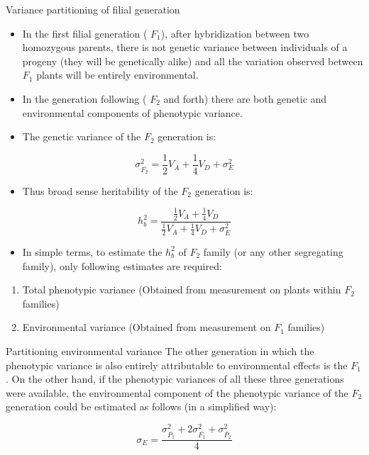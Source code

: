 \documentclass[11pt,ignorenonframetext,aspectratio=169]{beamer}
\providecommand{\tightlist}{%
  \setlength{\itemsep}{0pt}\setlength{\parskip}{0pt}}
\begin{document}
\begin{frame}{Variance partitioning of filial generation}
\protect\hypertarget{variance-partitioning-of-filial-generation}{}
\begin{itemize}
\tightlist
\item
  In the first filial generation ( \(F_1\)), after hybridization between
  two homozygous parents, there is not genetic variance between
  individuals of a progeny (they will be genetically alike) and all the
  variation observed between \(F_1\) plants will be entirely
  environmental.
\item
  In the generation following ( \(F_2\) and forth) there are both
  genetic and environmental components of phenotypic variance.
\item
  The genetic variance of the \(F_2\) generation is:
\end{itemize}

\[
\sigma_{\bar{F_2}}^2 = \frac{1}{2}V_A + \frac{1}{4}V_D + \sigma_E^2
\]

\begin{itemize}
\tightlist
\item
  Thus broad sense heritability of the \(F_2\) generation is:
\end{itemize}

\[
\label{eqn:hbs-filial}
h_b^2 = \frac{\frac{1}{2}V_A + \frac{1}{4}V_D}{\frac{1}{2}V_A + \frac{1}{4}V_D + \sigma_E^2}
\tag{iii}
\]

\begin{itemize}
\tightlist
\item
  In simple terms, to estimate the \(h_b^2\) of \(F_2\) family (or any
  other segregating family), only following estimates are required:
\end{itemize}

\begin{enumerate}
\tightlist
\item
  Total phenotypic variance (Obtained from measurement on plants within
  \(F_2\) families)
\item
  Environmental variance (Obtained from measurement on \(F_1\) families)
\end{enumerate}
\end{frame}

\begin{frame}{Partitioning environmental variance}
\protect\hypertarget{partitioning-environmental-variance}{}
The other generation in which the phenotypic variance is also entirely
attributable to environmental effects is the \(F_1\). On the other hand,
if the phenotypic variances of all these three generations were
available, the environmental component of the phenotypic variance of the
\(F_2\) generation could be estimated as follows (in a simplified way):

\[\sigma_E = \frac{\sigma_{\bar{P_1}}^2 + 2\sigma_{\bar{F_1}}^2 + \sigma_{\bar{P_2}}^2}{4}\]
\end{frame}
\end{document}
